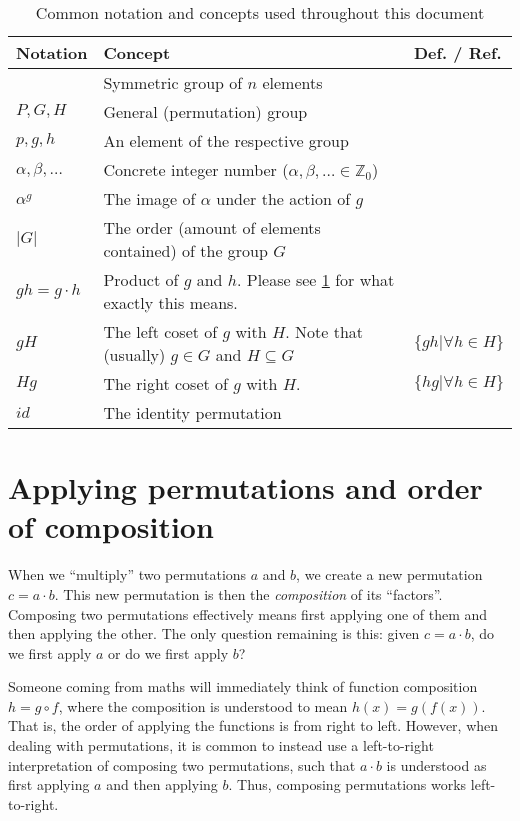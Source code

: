 \documentclass[parskip=half]{scrartcl}
\begin{document}
	\begin{table}[!h]
		\centering
		\caption{Common notation and concepts used throughout this document}
		\label{tab:notation}

		\begin{tabular}{p{} p{} p{}}
			\toprule
			\textbf{Notation} & \textbf{Concept} & \textbf{Def. / Ref.} \\
			\midrule
			\Sym{n} & Symmetric group of $n$ elements & \textcite{Wiki_SymmetricGroup} \\
			$P, G, H$ & General (permutation) group & \\
			$p, g, h$ & An element of the respective group & \\
			$\alpha, \beta, \ldots$ & Concrete integer number ($\alpha, \beta, \ldots \in \mathbb{Z}_0$) & \\
			$\alpha^g$ & The image of $\alpha$ under the action of $g$ & \\
			$|G|$ & The order (amount of elements contained) of the group $G$ & \\
			$gh = g \cdot h$ & Product of $g$ and $h$. Please see \cref{sec:CompositionOrder} for what exactly this means. & \\
			$gH$ & The left coset of $g$ with $H$. Note that (usually) $g \in G$ and $H \subseteq G$ & $\{ g h | \forall h \in H \}$ \\
			$Hg$ & The right coset of $g$ with $H$. & $\{ h g | \forall h \in H \}$ \\
			$id$ & The identity permutation & \\
			\bottomrule
		\end{tabular}
	\end{table}


	\section{Applying permutations and order of composition}
	\label{sec:CompositionOrder}

	When we \enquote{multiply} two permutations $a$ and $b$, we create a new permutation $c = a \cdot b$. This new permutation is then the
	\emph{composition} of its \enquote{factors}. Composing two permutations effectively means first applying one of them and then applying the other.
	The only question remaining is this: given $c = a \cdot b$, do we first apply $a$ or do we first apply $b$?

	Someone coming from maths will immediately think of function composition $h = g \circ f$, where the composition is understood to mean
	$h(x) = g(f(x))$. That is, the order of applying the functions is from right to left. However, when dealing with permutations, it is common to
	instead use a left-to-right interpretation of composing two permutations, such that $a \cdot b$ is understood as first applying $a$ and then
	applying $b$. Thus, composing permutations works left-to-right.
\end{document}
